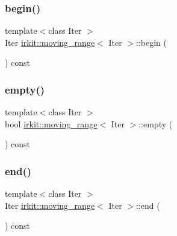 \mbox{\label{structirkit_1_1moving__range_af58c3dbe1e87c3222ee4a80aa745d9a1}} 
\subsubsection{\texorpdfstring{begin()}{begin()}}
{\footnotesize\ttfamily template$<$class Iter $>$ \\
Iter \mbox{\hyperlink{structirkit_1_1moving__range}{irkit\+::moving\+\_\+range}}$<$ Iter $>$\+::begin (\begin{DoxyParamCaption}{ }\end{DoxyParamCaption}) const\hspace{0.3cm}{\ttfamily [inline]}}

\mbox{\label{structirkit_1_1moving__range_a8d4e48c5d31fbc158da77eec0c90010e}} 
\subsubsection{\texorpdfstring{empty()}{empty()}}
{\footnotesize\ttfamily template$<$class Iter $>$ \\
bool \mbox{\hyperlink{structirkit_1_1moving__range}{irkit\+::moving\+\_\+range}}$<$ Iter $>$\+::empty (\begin{DoxyParamCaption}{ }\end{DoxyParamCaption}) const\hspace{0.3cm}{\ttfamily [inline]}}

\mbox{\label{structirkit_1_1moving__range_a5e5ff06f38d6cdba4735e7dd632759ef}} 
\subsubsection{\texorpdfstring{end()}{end()}}
{\footnotesize\ttfamily template$<$class Iter $>$ \\
Iter \mbox{\hyperlink{structirkit_1_1moving__range}{irkit\+::moving\+\_\+range}}$<$ Iter $>$\+::end (\begin{DoxyParamCaption}{ }\end{DoxyParamCaption}) const\hspace{0.3cm}{\ttfamily [inline]}}


